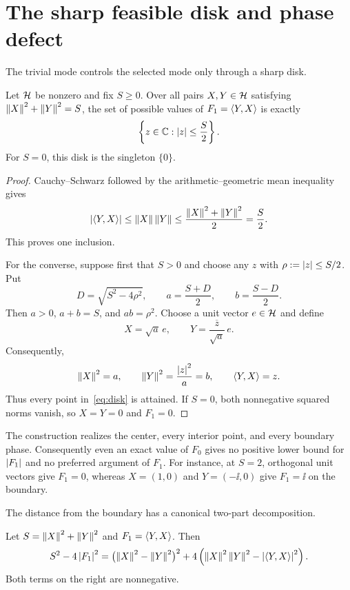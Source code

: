 \section{The sharp feasible disk and phase defect}\label{sec:disk}

The trivial mode controls the selected mode only through a sharp disk.

\begin{theorem}\label{thm:disk}
Let $\mathcal{H}$ be nonzero and fix $S\geq0$.  Over all pairs $X,Y\in\mathcal{H}$ satisfying
$\left\lVert X\right\rVert^2+\left\lVert Y\right\rVert^2=S$, the set of possible values of
$F_1=\left\langle Y,X\right\rangle$ is exactly
\begin{equation}\label{eq:disk}
 \left\{z\in\mathbb{C}:\left\lvert z\right\rvert\leq\frac S2\right\}.
\end{equation}
For $S=0$, this disk is the singleton $\{0\}$.
\end{theorem}

\begin{proof}
Cauchy--Schwarz followed by the arithmetic--geometric mean inequality gives
\[
 \left\lvert \left\langle Y,X\right\rangle\right\rvert\leq\left\lVert X\right\rVert\left\lVert Y\right\rVert
 \leq\frac{\left\lVert X\right\rVert^2+\left\lVert Y\right\rVert^2}{2}=\frac S2.
\]
This proves one inclusion.

For the converse, suppose first that $S>0$ and choose any $z$ with
$\rho:=\left\lvert z\right\rvert\leq S/2$.  Put
\[
 D=\sqrt{S^2-4\rho^2},\qquad
 a=\frac{S+D}{2},\qquad b=\frac{S-D}{2}.
\]
Then $a>0$, $a+b=S$, and $ab=\rho^2$.  Choose a unit vector $e\in\mathcal{H}$ and
define
\begin{equation}\label{eq:disk-witness}
 X=\sqrt a\,e,\qquad
 Y=\frac{\overline z}{\sqrt a}\,e.
\end{equation}
Consequently,
\[
 \left\lVert X\right\rVert^2=a,\qquad
 \left\lVert Y\right\rVert^2=\frac{\left\lvert z\right\rvert^2}{a}=b,
 \qquad
 \left\langle Y,X\right\rangle=z.
\]
Thus every point in~\eqref{eq:disk} is attained.  If $S=0$, both nonnegative
squared norms vanish, so $X=Y=0$ and $F_1=0$.
\end{proof}

The construction realizes the center, every interior point, and every
boundary phase.  Consequently even an exact value of $F_0$ gives no positive
lower bound for $\left\lvert F_1\right\rvert$ and no preferred argument of $F_1$.  For instance,
at $S=2$, orthogonal unit vectors give $F_1=0$, whereas $X=(1,0)$ and
$Y=(-\ii,0)$ give $F_1=\ii$ on the boundary.

The distance from the boundary has a canonical two-part decomposition.

\begin{theorem}\label{thm:defect}
Let $S=\left\lVert X\right\rVert^2+\left\lVert Y\right\rVert^2$ and $F_1=\left\langle Y,X\right\rangle$.  Then
\begin{equation}\label{eq:defect}
 S^2-4\left\lvert F_1\right\rvert^2
 =\bigl(\left\lVert X\right\rVert^2-\left\lVert Y\right\rVert^2\bigr)^2
  +4\left(\left\lVert X\right\rVert^2\left\lVert Y\right\rVert^2-\left\lvert \left\langle Y,X\right\rangle\right\rvert^2\right).
\end{equation}
Both terms on the right are nonnegative.
\end{theorem}

